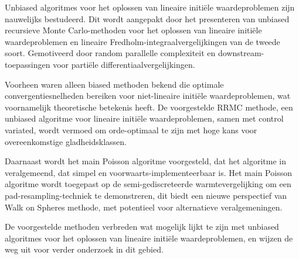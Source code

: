 Unbiased algoritmes voor het oplossen van lineaire initiële waardeproblemen zijn
nauwelijks bestudeerd.
Dit wordt aangepakt door het presenteren van unbiased recursieve Monte Carlo-methoden
voor het oplossen van lineaire initiële waardeproblemen en lineaire Fredholm-integraalvergelijkingen
van de tweede soort. Gemotiveerd door random
parallelle complexiteit en downstream-toepassingen voor partiële differentiaalvergelijkingen.

Voorheen waren alleen biased methoden bekend die optimale convergentiesnelheden bereiken
voor niet-lineaire initiële waardeproblemen, wat voornamelijk theoretische betekenis heeft.
De voorgestelde RRMC methode, een unbiased algoritme voor lineaire initiële waardeproblemen,
samen met control variated, wordt vermoed om orde-optimaal te zijn met hoge kans
voor overeenkomstige gladheidsklassen.

Daarnaast wordt het main Poisson algoritme voorgesteld, dat het algoritme in \cite{acebron_monte_2016} veralgemeend,
dat simpel en voorwaarts-implementeerbaar is. Het main Poisson algoritme wordt toegepast op de semi-gediscreteerde
warmtevergelijking om een pad-resampling-techniek te demonstreren, dit biedt een nieuwe perspectief van Walk on Spheres methode,
met potentieel voor alternatieve veralgemeningen.

De voorgestelde methoden verbreden
wat mogelijk lijkt te zijn met unbiased algoritmes voor
het oplossen van lineaire initiële waardeproblemen,
en wijzen de weg uit voor verder onderzoek in dit gebied.
